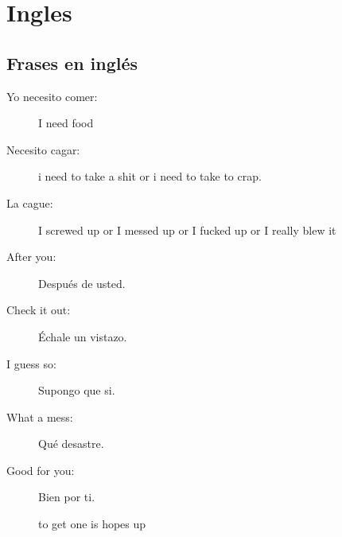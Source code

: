 \part{Ingles}

\chapter{Frases en ingl\'es}

\begin{description}
	\item[Yo necesito comer: ] I need food
	\item[Necesito cagar: ] i need to take a shit or i need to take to crap.
	\item[La cague: ] I screwed up or I messed up or I fucked up or I really blew it
	\item[After you: ] Despu\'es de usted.
	\item[Check it out: ] \'Echale un vistazo.
	\item[I guess so: ] Supongo que si.
	\item[What a mess: ] Qu\'e desastre.
	\item[Good for you: ] Bien por ti.			
	
	to get one is hopes up 
\end{description}

